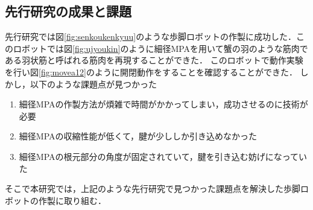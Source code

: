 \subsection{先行研究の成果と課題}
先行研究では図\ref{fig:senkoukenkyuu}\cite{hasegawa}のような歩脚ロボットの作製に成功した．このロボットでは図\ref{fig:ujyoukin}のように細径MPAを用いて蟹の羽のような筋肉である羽状筋と呼ばれる筋肉を再現することができた\cite{hasegawa}．
このロボットで動作実験を行い図\ref{fig:movea12}のように開閉動作をすることを確認することができた．
しかし，以下のような課題点が見つかった\cite{hasegawa}
\begin{enumerate}
  \item 細径MPAの作製方法が煩雑で時間がかかってしまい，成功させるのに技術が必要
  \item 細径MPAの収縮性能が低くて，腱が少ししか引き込めなかった
  \item 細径MPAの根元部分の角度が固定されていて，腱を引き込む妨げになっていた
\end{enumerate}
そこで本研究では，上記のような先行研究で見つかった課題点を解決した歩脚ロボットの作製に取り組む．
